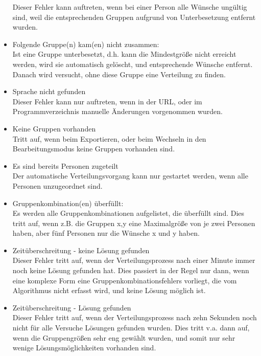 \documentclass[a4paper,11pt]{article}
\begin{document}
\begin{itemize}
    Dieser Fehler kann auftreten, wenn bei einer Person alle Wünsche ungültig sind, weil die entsprechenden Gruppen aufgrund von Unterbesetzung entfernt wurden.
    \item Folgende Gruppe(n) kam(en) nicht zusammen: \\
    Ist eine Gruppe unterbesetzt, d.h. kann die Mindestgröße nicht erreicht werden, wird sie automatisch gelöscht, und entsprechende Wünsche entfernt. Danach wird versucht, ohne diese Gruppe eine Verteilung zu finden.
    \item Sprache nicht gefunden \\
    Dieser Fehler kann nur auftreten, wenn in der URL, oder im Programmverzeichnis manuelle Änderungen vorgenommen wurden.
    \item Keine Gruppen vorhanden \\
    Tritt auf, wenn beim Exportieren, oder beim Wechseln in den Bearbeitungsmodus keine Gruppen vorhanden sind.
    \item Es sind bereits Personen zugeteilt \\
    Der automatische Verteilungsvorgang kann nur gestartet werden, wenn alle Personen unzugeordnet sind.
    \item Gruppenkombination(en) überfüllt: \\
    Es werden alle Gruppenkombinationen aufgelistet, die überfüllt sind. Dies tritt auf, wenn z.B. die Gruppen x,y eine Maximalgröße von je zwei Personen haben, aber fünf Personen nur die Wünsche x und y haben.
    \item Zeitüberschreitung - keine Lösung gefunden \\
    Dieser Fehler tritt auf, wenn der Verteilungsprozess nach einer Minute immer noch keine Lösung gefunden hat. Dies passiert in der Regel nur dann, wenn eine komplexe Form eine Gruppenkombinationsfehlers vorliegt, die vom Algorithmus nicht erfasst wird, und keine Lösung möglich ist.
    \item Zeitüberschreitung - Lösung gefunden \\
    Dieser Fehler tritt auf, wenn der Verteilungsprozess nach zehn Sekunden noch nicht für alle Versuche Lösungen gefunden wurden. Dies tritt v.a. dann auf, wenn die Gruppengrößen sehr eng gewählt wurden, und somit nur sehr wenige Lösungsmöglichkeiten vorhanden sind.
\end{itemize}
\end{document}
